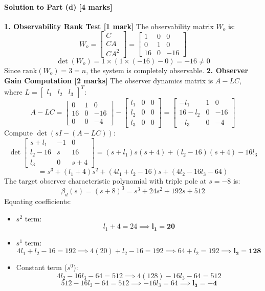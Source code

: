 \documentclass[12pt,onecolumn,twoside ]{article}
\begin{document}
	\paragraph{Solution to Part (d) [4 marks]}
	\textbf{1. Observability Rank Test [1 mark]} The observability matrix $W_o$ is: \[
	W_o = \begin{bmatrix} C \\ CA \\ CA^2 \end{bmatrix} = \begin{bmatrix} 1 & 0 & 0 \\ 0 & 1 & 0 \\ 16 & 0 & -16 \end{bmatrix}
	\] \[
	\det(W_o) = 1 \times (1 \times (-16) - 0) = -16 \neq 0
	\] Since $\text{rank}(W_o) = 3 = n$, the system is completely observable.
	\textbf{2. Observer Gain Computation [2 marks]} The observer dynamics matrix is $A - LC$, where $L = \begin{bmatrix} l_1 & l_2 & l_3 \end{bmatrix}^T$: \[
	A - LC = \begin{bmatrix} 0 & 1 & 0 \\ 16 & 0 & -16 \\ 0 & 0 & -4 \end{bmatrix} - \begin{bmatrix} l_1 & 0 & 0 \\ l_2 & 0 & 0 \\ l_3 & 0 & 0 \end{bmatrix} = \begin{bmatrix} -l_1 & 1 & 0 \\ 16 - l_2 & 0 & -16 \\ -l_3 & 0 & -4 \end{bmatrix}
	\] Compute $\det(sI - (A - LC))$: \[
	\det\begin{bmatrix} s + l_1 & -1 & 0 \\ l_2 - 16 & s & 16 \\ l_3 & 0 & s + 4 \end{bmatrix} = (s + l_1)s(s + 4) + (l_2 - 16)(s + 4) - 16 l_3
	\] \[
	= s^3 + (l_1 + 4)s^2 + (4l_1 + l_2 - 16)s + (4l_2 - 16l_3 - 64)
	\] The target observer characteristic polynomial with triple pole at $s = -8$ is: \[
	\beta_d(s) = (s + 8)^3 = s^3 + 24s^2 + 192s + 512
	\] Equating coefficients:
	\begin{itemize}
		\item
		$s^2$ term: \[
		l_1 + 4 = 24 \implies \mathbf{l_1 = 20}
		\]
		\item
		$s^1$ term: \[
		4l_1 + l_2 - 16 = 192 \implies 4(20) + l_2 - 16 = 192 \implies 64 + l_2 = 192 \implies \mathbf{l_2 = 128}
		\]
		\item
		Constant term ($s^0$): \[
		4l_2 - 16l_3 - 64 = 512 \implies 4(128) - 16l_3 - 64 = 512
		\] \[
		512 - 16l_3 - 64 = 512 \implies -16l_3 = 64 \implies \mathbf{l_3 = -4}
		\]
	\end{itemize}
\end{document}
